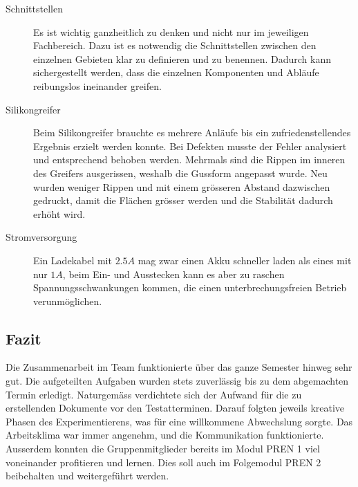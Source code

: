 \begin{description}
\item[Schnittstellen] Es ist wichtig ganzheitlich zu denken und nicht nur im jeweiligen Fachbereich. Dazu ist es notwendig die Schnittstellen zwischen den einzelnen Gebieten klar zu definieren und zu benennen. Dadurch kann sichergestellt werden, dass die einzelnen Komponenten und Abläufe reibungslos ineinander greifen.
\item[Silikongreifer] Beim Silikongreifer brauchte es mehrere Anläufe bis ein zufriedenstellendes Ergebnis erzielt werden konnte. Bei Defekten musste der Fehler analysiert und entsprechend behoben werden. Mehrmals sind die Rippen im inneren des Greifers ausgerissen, weshalb die Gussform angepasst wurde. Neu wurden weniger Rippen und mit einem grösseren Abstand dazwischen gedruckt, damit die Flächen grösser werden und die Stabilität dadurch erhöht wird.
\item[Stromversorgung] Ein Ladekabel mit $2.5A$ mag zwar einen Akku schneller laden als eines mit nur $1A$, beim Ein- und Ausstecken kann es aber zu raschen Spannungsschwankungen kommen, die einen unterbrechungsfreien Betrieb verunmöglichen.
\end{description}

\subsection{Fazit}

Die Zusammenarbeit im Team funktionierte über das ganze Semester hinweg sehr gut. Die aufgeteilten Aufgaben wurden stets zuverlässig bis zu dem abgemachten Termin erledigt. Naturgemäss verdichtete sich der Aufwand für die zu erstellenden Dokumente vor den Testatterminen. Darauf folgten jeweils kreative Phasen des Experimentierens, was für eine willkommene Abwechslung sorgte. Das Arbeitsklima war immer angenehm, und die Kommunikation funktionierte. Ausserdem konnten die Gruppenmitglieder bereits im Modul PREN 1 viel voneinander profitieren und lernen. Dies soll auch im Folgemodul PREN 2 beibehalten und weitergeführt werden.


